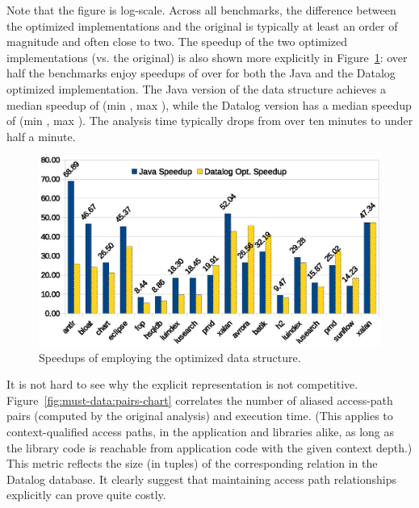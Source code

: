 Note that the figure is log-scale. Across all benchmarks, the difference between the optimized implementations and the original is typically at least an order of magnitude and often close to two.  The speedup of the two optimized implementations (vs. the original) is also shown more explicitly in Figure~\ref{fig:must-data:speedup-chart}: over half the benchmarks enjoy speedups of over  for both the Java and the Datalog optimized implementation. The Java version of the data structure achieves a median speedup of  (min , max ), while the Datalog version has a median speedup of  (min , max ).  The analysis time typically drops from over ten minutes to under half a minute. 

\begin{figure}[htp]
\centering
\includegraphics[clip,width=0.77\linewidth, height=0.4275\linewidth]{assets/must-data/speedup.eps}
\caption[Speedups of employing the optimized data structure]{Speedups of employing the optimized data structure.}
\label{fig:must-data:speedup-chart}
\end{figure}

It is not hard to see why the explicit representation is not competitive. Figure~\ref{fig:must-data:pairs-chart} correlates the number of aliased access-path pairs (computed by the original analysis) and execution time. (This applies to context-qualified access paths, in the application and libraries alike, as long as the library code is reachable from application code with the given context depth.) This metric reflects the size (in tuples) of the corresponding relation in the Datalog database. It clearly suggest that maintaining access path relationships explicitly can prove quite costly.

